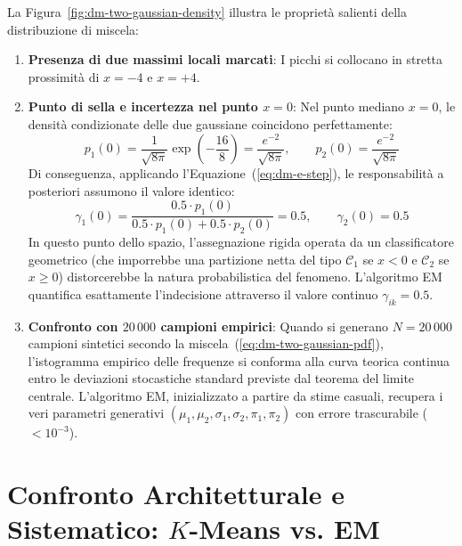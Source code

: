 La Figura~\ref{fig:dm-two-gaussian-density} illustra le proprietà salienti della distribuzione di miscela:
\begin{enumerate}
    \item \textbf{Presenza di due massimi locali marcati}: I picchi si collocano in stretta prossimità di $x = -4$ e $x = +4$.
    \item \textbf{Punto di sella e incertezza nel punto $x = 0$}: Nel punto mediano $x = 0$, le densità condizionate delle due gaussiane coincidono perfettamente:
    \begin{equation}
    p_1(0) = \frac{1}{\sqrt{8\pi}} \exp\left(-\frac{16}{8}\right) = \frac{e^{-2}}{\sqrt{8\pi}}, \qquad p_2(0) = \frac{e^{-2}}{\sqrt{8\pi}}
    \end{equation}
    Di conseguenza, applicando l'Equazione~(\ref{eq:dm-e-step}), le responsabilità a posteriori assumono il valore identico:
    \begin{equation}
    \gamma_{1}(0) = \frac{0.5 \cdot p_1(0)}{0.5 \cdot p_1(0) + 0.5 \cdot p_2(0)} = 0.5, \qquad \gamma_{2}(0) = 0.5
    \end{equation}
    In questo punto dello spazio, l'assegnazione rigida operata da un classificatore geometrico (che imporrebbe una partizione netta del tipo $\mathcal{C}_1$ se $x < 0$ e $\mathcal{C}_2$ se $x \ge 0$) distorcerebbe la natura probabilistica del fenomeno. L'algoritmo EM quantifica esattamente l'indecisione attraverso il valore continuo $\gamma_{ik} = 0.5$.
    \item \textbf{Confronto con $20\,000$ campioni empirici}: Quando si generano $N = 20\,000$ campioni sintetici secondo la miscela~(\ref{eq:dm-two-gaussian-pdf}), l'istogramma empirico delle frequenze si conforma alla curva teorica continua entro le deviazioni stocastiche standard previste dal teorema del limite centrale. L'algoritmo EM, inizializzato a partire da stime casuali, recupera i veri parametri generativi $(\mu_1, \mu_2, \sigma_1, \sigma_2, \pi_1, \pi_2)$ con errore trascurabile ($< 10^{-3}$).
\end{enumerate}

\section{Confronto Architetturale e Sistematico: \texorpdfstring{$K$}{K}-Means vs. EM}
\label{sec:dm-kmeans-em-comparison}

